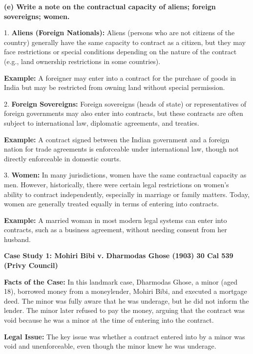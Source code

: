 \documentclass[12pt,a4paper]{book}
\begin{document}
\vspace{0.5cm}

\textbf{(e) Write a note on the contractual capacity of aliens; foreign sovereigns; women.}

1. \textbf{Aliens (Foreign Nationals):}  
Aliens (persons who are not citizens of the country) generally have the same capacity to contract as a citizen, but they may face restrictions or special conditions depending on the nature of the contract (e.g., land ownership restrictions in some countries).

\textbf{Example:}  
A foreigner may enter into a contract for the purchase of goods in India but may be restricted from owning land without special permission.

2. \textbf{Foreign Sovereigns:}  
Foreign sovereigns (heads of state) or representatives of foreign governments may also enter into contracts, but these contracts are often subject to international law, diplomatic agreements, and treaties.

\textbf{Example:}  
A contract signed between the Indian government and a foreign nation for trade agreements is enforceable under international law, though not directly enforceable in domestic courts.

3. \textbf{Women:}
In many jurisdictions, women have the same contractual capacity as men. However, historically, there were certain legal restrictions on women’s ability to contract independently, especially in marriage or family matters. Today, women are generally treated equally in terms of entering into contracts.

\textbf{Example:}  
A married woman in most modern legal systems can enter into contracts, such as a business agreement, without needing consent from her husband.

\vspace{0.5cm}

\textbf{Case Study 1: Mohiri Bibi v. Dharmodas Ghose (1903) 30 Cal 539 (Privy Council)}

\textbf{Facts of the Case:}  
In this landmark case, Dharmodas Ghose, a minor (aged 18), borrowed money from a moneylender, Mohiri Bibi, and executed a mortgage deed. The minor was fully aware that he was underage, but he did not inform the lender. The minor later refused to pay the money, arguing that the contract was void because he was a minor at the time of entering into the contract.

\textbf{Legal Issue:}  
The key issue was whether a contract entered into by a minor was void and unenforceable, even though the minor knew he was underage.
\end{document}
